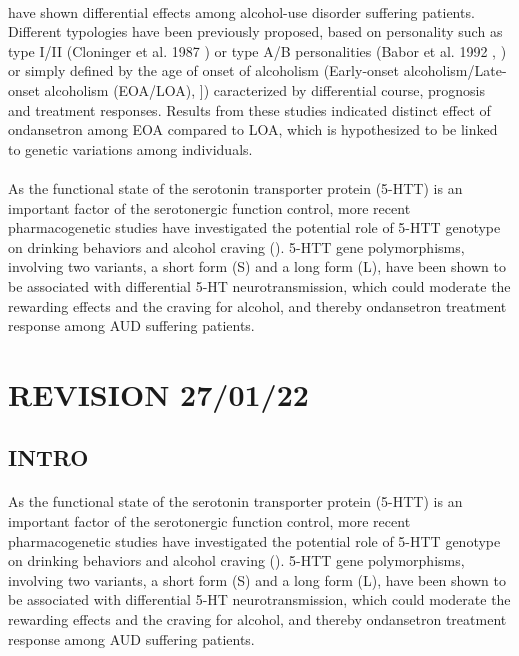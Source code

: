 \paragraph{}
have shown differential effects among alcohol-use disorder suffering patients. Different typologies have been previously proposed, based on personality such as type I/II (Cloninger et al. 1987 \cite{cloninger1987systematic}) or type A/B personalities (Babor et al. 1992 \cite{babor1992a}, \cite{babor1992b}) or simply defined by the age of onset of alcoholism (Early-onset alcoholism/Late-onset alcoholism (EOA/LOA),  ]) caracterized by differential course, prognosis and treatment responses. Results from these studies indicated distinct effect of ondansetron among EOA compared to LOA, which is hypothesized to be linked to genetic variations among individuals.
\paragraph{}
As the functional state of the serotonin transporter protein (5-HTT) is an important factor of the serotonergic function control, more recent pharmacogenetic studies have investigated the potential role of 5-HTT genotype on drinking behaviors and alcohol craving (\cite{ait2009can}). 5-HTT gene polymorphisms, involving two variants, a short form (S) and a long form (L), have been shown to be associated with differential 5-HT neurotransmission, which could moderate the rewarding effects and the craving for alcohol, and thereby ondansetron treatment response among AUD suffering patients.

\section{REVISION 27/01/22}
\subsection{INTRO}
\paragraph{}
As the functional state of the serotonin transporter protein (5-HTT) is an important factor of the serotonergic function control, more recent pharmacogenetic studies have investigated the potential role of 5-HTT genotype on drinking behaviors and alcohol craving (\cite{ait2009can}). 5-HTT gene polymorphisms, involving two variants, a short form (S) and a long form (L), have been shown to be associated with differential 5-HT neurotransmission, which could moderate the rewarding effects and the craving for alcohol, and thereby ondansetron treatment response among AUD suffering patients.

